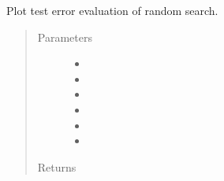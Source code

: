 \documentclass[letterpaper,10pt,english]{sphinxmanual}
\begin{document}
\begin{fulllineitems}
\label{\detokenize{index:plots.plot_random}}
Plot test error evaluation of random search.
\begin{quote}\begin{description}
\item[{Parameters}] \leavevmode\begin{itemize}
\item {} 
 \textendash{} 

\item {} 
 \textendash{} 

\item {} 
 \textendash{} 

\item {} 
 \textendash{} 

\item {} 
 \textendash{} 

\item {} 
 \textendash{} 

\end{itemize}

\item[{Returns}] \leavevmode


\end{description}\end{quote}

\end{fulllineitems}

\end{document}
